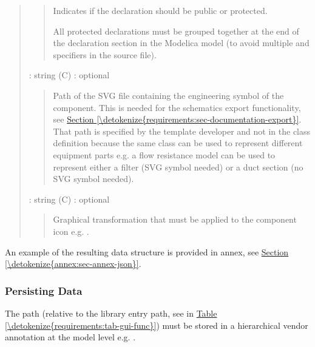 \documentclass[letterpaper,10pt, openany,english]{sphinxmanual}
\begin{document}
\begin{quote}
\begin{quote}
\begin{DUlineblock}{0em}
\item[] Indicates if the declaration should be public or protected.
\item[] All protected declarations must be grouped together at the end of the declaration section in the Modelica model (to avoid multiple  and  specifiers in the source file).
\end{DUlineblock}
\end{quote}

 : string (C) : optional
\begin{quote}

Path of the SVG file containing the engineering symbol of the component. This is needed for the schematics export functionality, see \hyperref[\detokenize{requirements:sec-documentation-export}]{Section \ref{\detokenize{requirements:sec-documentation-export}}}. That path is specified by the template developer and not in the class definition because the same class can be used to represent different equipment parts e.g. a flow resistance model can be used to represent either a filter (SVG symbol needed) or a duct section (no SVG symbol needed).
\end{quote}

 : string (C) : optional
\begin{quote}

Graphical transformation that must be applied to the component icon e.g. .
\end{quote}
\end{quote}

An example of the resulting data structure is provided in annex, see \hyperref[\detokenize{annex:sec-annex-json}]{Section \ref{\detokenize{annex:sec-annex-json}}}.


\subsubsection{Persisting Data}
\label{\detokenize{requirements:persisting-data}}\label{\detokenize{requirements:sec-persisting-data}}

The path (relative to the library entry path, see  in \hyperref[\detokenize{requirements:tab-gui-func}]{Table \ref{\detokenize{requirements:tab-gui-func}}}) must be stored in a hierarchical vendor annotation at the model level e.g. .
\end{document}

